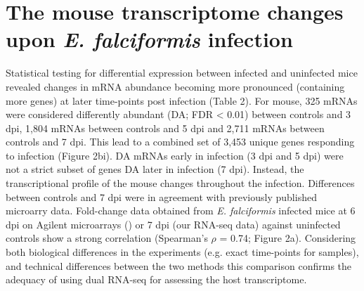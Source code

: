 \documentclass{bmcart}
\begin{document}
\section*{The mouse transcriptome changes upon \emph{E. falciformis} infection}
Statistical testing for differential expression between infected and uninfected mice revealed changes in mRNA abundance becoming more pronounced (containing more genes) at later time-points post infection (Table 2). For mouse, 325 mRNAs were considered differently abundant (DA; FDR < 0.01) between controls and 3 dpi, 1,804 mRNAs between controls and 5 dpi and 2,711 mRNAs between controls and 7 dpi. This lead to a combined set of 3,453 unique genes responding to infection (Figure 2bi). DA mRNAs early in infection (3 dpi and 5 dpi) were not a strict subset of genes DA later in infection (7 dpi). Instead, the transcriptional profile of the mouse changes throughout the infection. Differences between controls and 7 dpi were in agreement with previously published microarry data. Fold-change data obtained from \textit{E. falciformis} infected mice at 6 dpi on Agilent microarrays (\cite{schmidt12}) or 7 dpi (our RNA-seq data) against uninfected controls show a strong correlation (Spearman's $\rho$ = 0.74; Figure 2a). Considering both biological differences in the experiments (e.g. exact time-points for samples), and technical differences between the two methods this comparison confirms the adequacy of using dual RNA-seq for assessing the host transcriptome.
\end{document}
